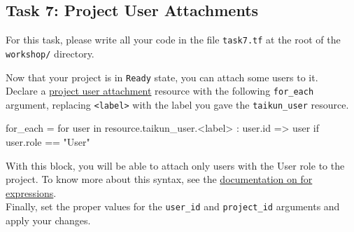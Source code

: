 \subsection{Task 7: Project User Attachments}\label{sec:task7}

\begin{note}
For this task, please write all your code in the file \texttt{task7.tf}
at the root of the \texttt{workshop/} directory.
\end{note}

Now that your project is in \texttt{Ready} state, you can attach some users to it.\\

Declare a \href{https://intuinewin.github.io/taikun-docs/resources/project_user_attachment.html}{project user attachment}
resource with the following \texttt{for\_each} argument, replacing \texttt{<label>} with the label you gave
the \texttt{taikun\_user} resource.
\begin{tf}
  for_each = {
    for user in resource.taikun_user.<label> : user.id => user
    if user.role == "User"
  }
\end{tf}
With this block, you will be able to attach only users with the User role to the project.
To know more about this syntax, see the
\href{https://www.terraform.io/docs/language/expressions/for.html}{documentation on for expressions}.\\

Finally, set the proper values for the \texttt{user\_id} and \texttt{project\_id} arguments
and apply your changes.

